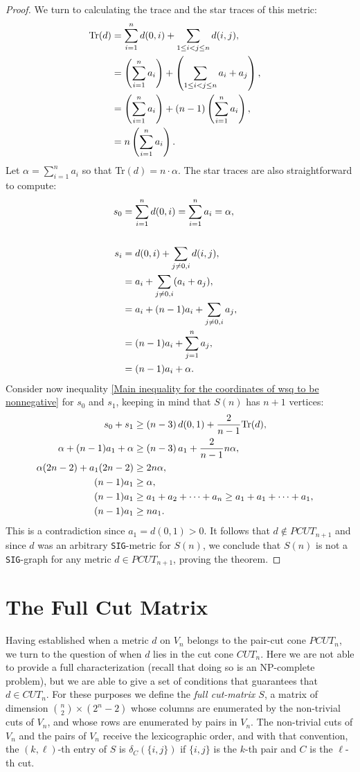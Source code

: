 \documentclass[12pt]{amsart}
\numberwithin{theorem}{section}
\theoremstyle{remark}
\newcommand{\sigg}{{\tt SIG}}
\begin{document}
\begin{proof}
We turn to calculating the trace and the star traces of this metric:
\begin{align*}
\text{Tr}(d) & = \sum _{i=1}^n d(0,i) + \sum _{1\le i <j \le n} d(i,j), \cr 
&= \left( \sum _{i=1}^n a_i\right) + \left(\sum _{1\le i <j \le n} a_i+a_j\right), \cr 
&= \left( \sum _{i=1}^n a_i\right) + (n-1)\left(\sum _{i=1}^n a_i    \right), \cr 
&= n \left( \sum _{i=1}^n a_i\right).
\end{align*} 
Let $\alpha = \sum _{i=1}^na_i$ so that Tr$(d) = n\cdot \alpha$. The star traces are also straightforward to compute:
\begin{align*}
s_0& = \sum _{i=1}^n d(0,i) = \sum _{i=1}^n a_i = \alpha, \cr 
& \cr 
s_i & = d(0,i) + \sum _{j\ne 0,i} d(i,j), \cr 
& = a_i + \sum _{j\ne 0,i} (a_i +a_j), \cr 
& = a_i + (n-1)a_i + \sum _{j\ne 0,i} a_j, \cr
& = (n-1)a_i + \sum _{j=1}^n a_j, \cr
& = (n-1)a_i + \alpha. 
\end{align*}
Consider now inequality \eqref{Main inequality for the coordinates of wsq to be nonnegative} for $s_0$ and $s_1$, keeping in mind that $S(n)$ has $n+1$ vertices:
\begin{align*}
s_0+s_1 & \ge (n-3)\, d(0,1) + \frac{2}{n-1}\text{Tr}(d), \cr 
\alpha + (n-1)a_1+\alpha & \ge (n-3)\, a_1 + \frac{2}{n-1}n\alpha, \cr 
\alpha (2n-2) + a_1(2n-2) & \ge 2n\alpha, \cr 
(n-1)a_1 & \ge \alpha, \cr 
(n-1)a_1 & \ge a_1+a_2+\dots +a_n \ge a_1+a_1+\dots +a_1, \cr
(n-1)a_1 & \ge na_1.
\end{align*}
This is a contradiction since $a_1=d(0,1)>0$. It follows that $d\notin PCUT_{n+1}$ and since $d$ was an arbitrary \sigg-metric for $S(n)$, we conclude that $S(n)$ is not a \sigg-graph for any metric $d\in PCUT_{n+1}$, proving the theorem.  
\end{proof}
\section{The Full Cut Matrix} \label{Section on the full cut matrix}
Having established when a metric $d$ on $V_n$ belongs to the pair-cut cone $PCUT_n$, we turn to the question of when $d$ lies in the cut cone $CUT_n$. Here we are not able to provide a full characterization (recall that doing so is an NP-complete problem), but we are able to give a set of conditions that guarantees that $d\in CUT_n$. For these purposes we define the {\em full cut-matrix $S$}, a matrix of dimension ${n \choose 2} \times (2^n-2)$ whose columns are enumerated by the non-trivial cuts of $V_n$, and whose rows are enumerated by pairs in $V_n$. The non-trivial cuts of $V_n$ and the pairs of $V_n$ receive the lexicographic order, and with that convention, the $(k,\ell)$-th entry of $S$ is $\delta_C(\{i,j\})$ if $\{i,j\}$ is the $k$-th pair and $C$ is the $\ell$-th cut. 
\end{document}
